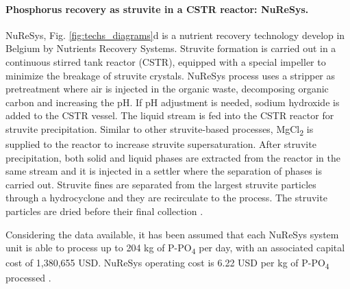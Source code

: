 \begin{refsection}[referencesCh4]
\begin{table}[h] 
		\centering
		\caption{Sizing and equipment cost estimated for Ostara Pearl process} \label{table:ostara_costs}
\end{table}

\paragraph{Phosphorus recovery as struvite in a CSTR reactor: \newline NuReSys.}
NuReSys, Fig. \ref{fig:techs_diagrams}d is a nutrient recovery technology develop in Belgium by Nutrients Recovery Systems. Struvite formation is carried out in a continuous stirred tank reactor (CSTR), equipped with a special impeller to minimize the breakage of struvite crystals. NuReSys process uses a stripper as pretreatment where air is injected in the organic waste, decomposing organic carbon and increasing the pH. If pH adjustment is needed, sodium hydroxide is added to the CSTR vessel. The liquid stream is fed into the CSTR reactor for struvite precipitation. Similar to other struvite-based processes, MgCl\textsubscript{2} is supplied to the reactor to increase struvite supersaturation. After struvite precipitation, both solid and liquid phases are extracted from the reactor in the same stream and it is injected in a settler where the separation of phases is carried out. Struvite fines are separated from the largest struvite particles through a hydrocyclone and they are recirculate to the process. The struvite particles are dried before their final collection \citep{Pearl2Kcost2}.

Considering the data available, it has been assumed that each NuReSys system unit is able to process up to 204 kg of P-PO\textsubscript{4} per day, with an associated capital cost of 1,380,655 USD. NuReSys operating cost is 6.22 USD per kg of P-PO\textsubscript{4} processed \citep{Pearl2Kcost2}.


\end{refsection}
